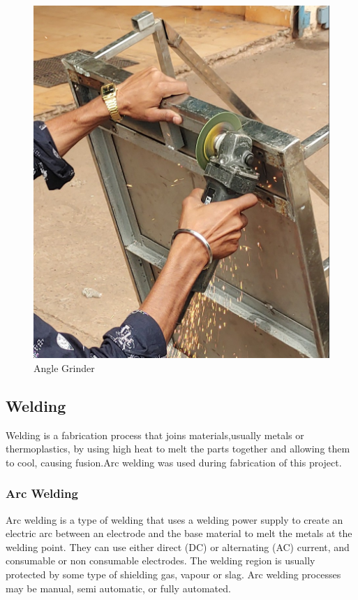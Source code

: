 \begin{figure}[h!]
    \centering
    \includegraphics[scale=0.1]{cutting.jpg}
    \caption{Angle Grinder}
    \label{fig:Angle Grinder}
\end{figure}





\subsection{Welding} \label{Welding}
Welding is a fabrication process that joins materials,usually metals or thermoplastics, by using high heat to melt the parts together and allowing them to cool, causing fusion.Arc welding was used during fabrication of this project.

\subsubsection{Arc Welding} \label{Arc Welding}
Arc welding is a type of welding that uses a welding power supply to create an electric arc between an electrode and the base material to melt the metals at the welding point. They can use either direct (DC) or alternating (AC) current, and consumable or non consumable electrodes. The welding region is usually protected by some type of shielding gas, vapour or slag. Arc welding processes may be manual, semi automatic, or fully automated.

